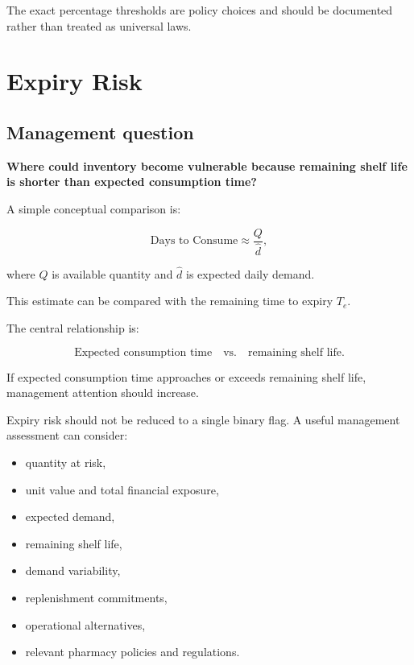 \documentclass[11pt,a4paper]{article}
\begin{document}
The exact percentage thresholds are policy choices and should be documented
rather than treated as universal laws.

\section{Expiry Risk}

\subsection{Management question}

\begin{principle}[Question]
\centering
\Large \textbf{Where could inventory become vulnerable because remaining
shelf life is shorter than expected consumption time?}
\end{principle}

A simple conceptual comparison is:

\[
\text{Days to Consume}
\approx
\frac{Q}{\widehat d},
\]

where \(Q\) is available quantity and \(\widehat d\) is expected daily demand.

This estimate can be compared with the remaining time to expiry \(T_e\).

The central relationship is:

\[
\text{Expected consumption time}
\quad\text{vs.}\quad
\text{remaining shelf life}.
\]

If expected consumption time approaches or exceeds remaining shelf life,
management attention should increase.

Expiry risk should not be reduced to a single binary flag. A useful management
assessment can consider:

\begin{itemize}
\item quantity at risk,
\item unit value and total financial exposure,
\item expected demand,
\item remaining shelf life,
\item demand variability,
\item replenishment commitments,
\item operational alternatives,
\item relevant pharmacy policies and regulations.
\end{itemize}
\end{document}
